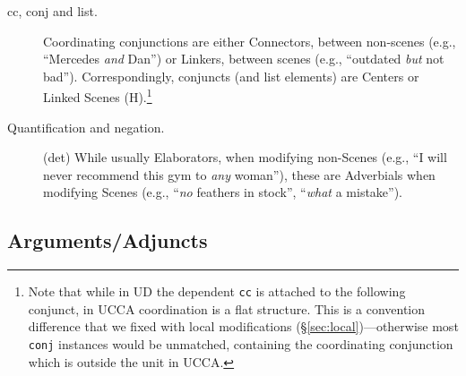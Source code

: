 \documentclass[11pt,a4paper]{article}
\begin{document}
\begin{description}
    \item[cc, conj and list.]
    Coordinating conjunctions are either Connectors, between non-scenes
    (e.g., ``Mercedes \textit{and} Dan'')
    or Linkers, between scenes
    (e.g., ``outdated \textit{but} not bad'').
    Correspondingly, conjuncts (and list elements)
    are Centers or Linked Scenes (H).\footnote{Note
    that while in UD the dependent \texttt{cc} is attached to the following conjunct,
    in UCCA coordination is a flat structure.
    This is a convention difference that we fixed with local modifications
    (\S\ref{sec:local})---otherwise most \texttt{conj} instances would be unmatched,
    containing the coordinating conjunction which is outside the unit in UCCA.}

    \item [Quantification and negation.] (det)
    While usually Elaborators, when modifying non-Scenes
    (e.g., ``I will never recommend this gym to \textit{any} woman''),
    these are Adverbials when modifying Scenes
    (e.g., ``\textit{no} feathers in stock'', ``\textit{what} a mistake'').
\end{description}

\subsection{Arguments/Adjuncts}\label{sec:arguments}
\end{document}
